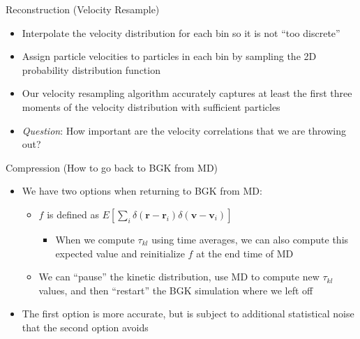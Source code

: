 \documentclass{beamer}
\begin{document}
	\begin{frame}{Reconstruction (Velocity Resample)}
		\begin{itemize}
			\item Interpolate the velocity distribution for each bin so it is not ``too discrete''
			\vspace{1em}
			\item Assign particle velocities to particles in each bin by sampling the 2D probability distribution function
			\vspace{1em}
			\item Our velocity resampling algorithm accurately captures at least the first three moments of the velocity distribution with sufficient particles
			\vspace{1em}
			\item \emph{Question}: How important are the velocity correlations that we are throwing out?
		\end{itemize}
	\end{frame}
	
	\begin{frame}{Compression (How to go back to BGK from MD)}
		\begin{itemize}
		\item We have two options when returning to BGK from MD:
		\vspace{0.5em}
		\begin{itemize}
		\item $f$ is defined as $E[\sum_{i}\delta(\mathbf{r}-\mathbf{r}_i)\delta(\mathbf{v}-\mathbf{v}_i)]$
		\vspace{0.5em}
		\begin{itemize}
		\item When we compute $\tau_{kl}$ using time averages, we can also compute this expected value and reinitialize $f$ at the end time of MD\vspace{0.5em}
		\end{itemize}
		\item We can ``pause'' the kinetic distribution, use MD to compute new $\tau_{kl}$ values, and then ``restart'' the BGK simulation where we left off\vspace{0.5em}
		\end{itemize}
		\item The first option is more accurate, but is subject to additional statistical noise that the second option avoids
		\end{itemize}
	\end{frame}
	
\end{document}
